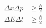 

\vspace*{\fill}
\centering

\begin{align*}
    \Delta x \Delta p &\geq \frac{\hbar}{2} \\
    \Delta E \Delta t &\geq \frac{\hbar}{2}
\end{align*}

\centering
\vspace*{\fill}

